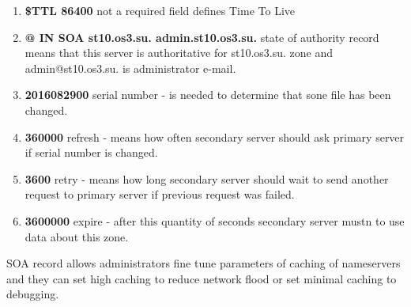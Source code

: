 \documentclass[a4paper,11pt]{article}
\begin{document}
\begin{enumerate}
    \item \textbf{\$TTL 86400} not a required field defines Time To Live
    \item \textbf{@ IN SOA st10.os3.su. admin.st10.os3.su.} state of authority record means that this server is authoritative for st10.os3.su. zone and admin@st10.os3.su. is administrator e-mail.
    \item \textbf{2016082900} serial number - is needed to determine that sone file has been changed.
    \item \textbf{360000} refresh - means how often secondary server should ask primary server if serial number is changed.
    \item \textbf{3600} retry - means how long secondary server should wait to send another request to primary server if previous request was failed.
    \item \textbf{3600000} expire - after this quantity of seconds secondary server mustn to use data about this zone.
\end{enumerate}

SOA record allows administrators fine tune parameters of caching of nameservers and they can set high caching to reduce network flood or set minimal caching to debugging.
\end{document}
